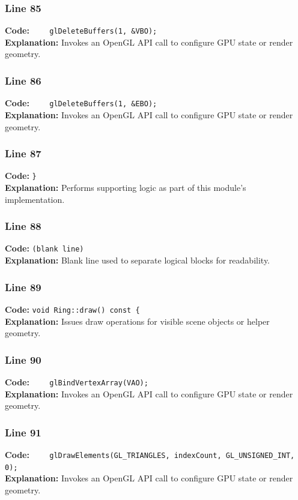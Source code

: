 \documentclass[11pt,a4paper]{article}
\begin{document}
\subsubsection*{Line 85}
\textbf{Code:} \verb|    glDeleteBuffers(1, &VBO);|\\
\textbf{Explanation:} Invokes an OpenGL API call to configure GPU state or render geometry.

\subsubsection*{Line 86}
\textbf{Code:} \verb|    glDeleteBuffers(1, &EBO);|\\
\textbf{Explanation:} Invokes an OpenGL API call to configure GPU state or render geometry.

\subsubsection*{Line 87}
\textbf{Code:} \verb|}|\\
\textbf{Explanation:} Performs supporting logic as part of this module's implementation.

\subsubsection*{Line 88}
\textbf{Code:} \texttt{(blank line)}\\
\textbf{Explanation:} Blank line used to separate logical blocks for readability.

\subsubsection*{Line 89}
\textbf{Code:} \verb|void Ring::draw() const {|\\
\textbf{Explanation:} Issues draw operations for visible scene objects or helper geometry.

\subsubsection*{Line 90}
\textbf{Code:} \verb|    glBindVertexArray(VAO);|\\
\textbf{Explanation:} Invokes an OpenGL API call to configure GPU state or render geometry.

\subsubsection*{Line 91}
\textbf{Code:} \verb|    glDrawElements(GL_TRIANGLES, indexCount, GL_UNSIGNED_INT, 0);|\\
\textbf{Explanation:} Invokes an OpenGL API call to configure GPU state or render geometry.
\end{document}

